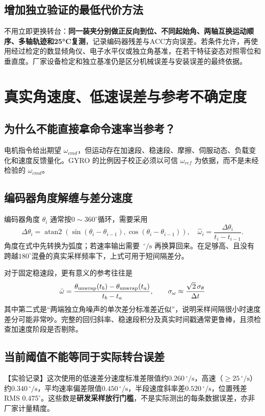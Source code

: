 \documentclass[UTF8,a4paper,11pt,oneside,openany,fontset=none]{ctexbook}
\newcommand{\dps}{\,^{\circ}/\mathrm s}
\begin{document}
\section{增加独立验证的最低代价方法}
不用立即更换转台：\textbf{同一装夹分别做正反向到位、不同起始角、两轴互换运动顺序、多轴轨迹和25°C复测}，记录编码器残差与ACC方向误差。若条件允许，再使用经过检定的数显倾角仪、电子水平仪或独立角基准，在若干特征姿态对照零位和垂直度。厂家设备检定和独立基准仍是区分机械误差与安装误差的最终依据。

\chapter{真实角速度、低速误差与参考不确定度}
\section{为什么不能直接拿命令速率当参考？}
电机指令给出期望 $\omega_{cmd}$，但运动存在加速段、稳速段、摩擦、伺服动态、负载变化和速度反馈量化。GYRO 的比例因子校正必须以可信 $\omega_{ref}$ 为依据，而不是未经检验的 $\omega_{cmd}$。

\section{编码器角度解缠与差分速度}
编码器角度 $\theta_i$ 通常按$0\sim360^\circ$循环，需要采用
\begin{equation}
\Delta\theta_i=\operatorname{atan2}(\sin(\theta_i-\theta_{i-1}),\cos(\theta_i-\theta_{i-1})),\quad\hat\omega_i=\frac{\Delta\theta_i}{t_i-t_{i-1}}.
\end{equation}
角度在式中先转换为弧度；若速率输出需要 $\dps$ 再换算回来。在足够高、且没有跨越$180^\circ$混叠的真实采样频率下，上式可用于短间隔差分。

对于固定稳速段，更有意义的参考往往是
\begin{equation}
\bar\omega=\frac{\theta_{\rm unwrap}(t_b)-\theta_{\rm unwrap}(t_a)}{t_b-t_a},\qquad
\sigma_\omega\approx\frac{\sqrt2\,\sigma_\theta}{\Delta t}
\end{equation}
其中第二式是“两端独立角噪声的单次差分标准差近似”，说明采样间隔很小时速度差分可能非常吵。完整的回归斜率、稳速段积分及真实时间戳通常更鲁棒，且须检查加速度阶段是否剔除。

\section{当前阈值不能等同于实际转台误差}
【实验记录】这次使用的低速差分速度标准差限值约$0.260\dps$，高速（$\ge25\dps$）约$0.340\dps$，平均速率偏差限值$0.450\dps$，半段速度斜率差$0.520\dps$，位置残差RMS $0.475^\circ$。这些数是\textbf{研发采样放行门槛}，不是实际测出的每条数据误差，亦非厂家计量精度。
\end{document}
